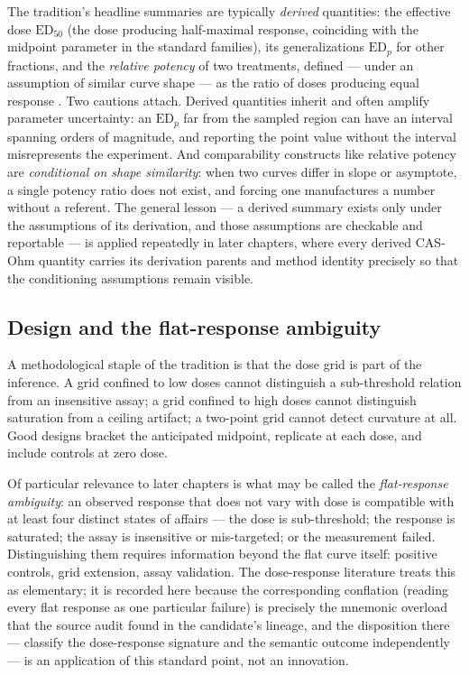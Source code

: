 The tradition's headline summaries are typically \emph{derived} quantities: the effective dose $\mathrm{ED}_{50}$ (the dose producing half-maximal response, coinciding with the midpoint parameter in the standard families), its generalizations $\mathrm{ED}_p$ for other fractions, and the \emph{relative potency} of two treatments, defined --- under an assumption of similar curve shape --- as the ratio of doses producing equal response \cite{ritz}. Two cautions attach. Derived quantities inherit and often amplify parameter uncertainty: an $\mathrm{ED}_p$ far from the sampled region can have an interval spanning orders of magnitude, and reporting the point value without the interval misrepresents the experiment. And comparability constructs like relative potency are \emph{conditional on shape similarity}: when two curves differ in slope or asymptote, a single potency ratio does not exist, and forcing one manufactures a number without a referent. The general lesson --- a derived summary exists only under the assumptions of its derivation, and those assumptions are checkable and reportable --- is applied repeatedly in later chapters, where every derived CAS-Ohm quantity carries its derivation parents and method identity precisely so that the conditioning assumptions remain visible.

\subsection{Design and the flat-response ambiguity}\label{ch02:dose:design}

A methodological staple of the tradition is that the dose grid is part of the inference. A grid confined to low doses cannot distinguish a sub-threshold relation from an insensitive assay; a grid confined to high doses cannot distinguish saturation from a ceiling artifact; a two-point grid cannot detect curvature at all. Good designs bracket the anticipated midpoint, replicate at each dose, and include controls at zero dose.

Of particular relevance to later chapters is what may be called the \emph{flat-response ambiguity}: an observed response that does not vary with dose is compatible with at least four distinct states of affairs --- the dose is sub-threshold; the response is saturated; the assay is insensitive or mis-targeted; or the measurement failed. Distinguishing them requires information beyond the flat curve itself: positive controls, grid extension, assay validation. The dose-response literature treats this as elementary; it is recorded here because the corresponding conflation (reading every flat response as one particular failure) is precisely the mnemonic overload that the source audit found in the candidate's lineage, and the disposition there --- classify the dose-response signature and the semantic outcome independently --- is an application of this standard point, not an innovation.

